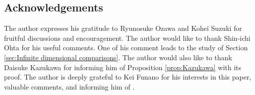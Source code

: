 \subsection*{{\rm Acknowledgements}}
The author expresses his gratitude to Ryunosuke Ozawa and Kohei Suzuki for fruitful discussions and encouragement.
The author would like to thank Shin-ichi Ohta for his useful comments.
One of his comment leads to the study of Section \ref{sec:Infinite dimensional comparisons}.
The author would also like to thank Daisuke Kazukawa for informing him of Proposition \ref{prop:Kazukawa} with its proof.
The author is deeply grateful to Kei Funano for his interests in this paper,
valuable comments,
and informing him of \cite{CGY}.

